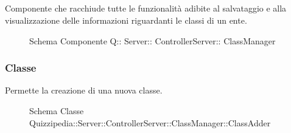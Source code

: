 \subsection{}
Componente che racchiude tutte le funzionalità adibite al salvataggio e alla visualizzazione delle informazioni riguardanti le classi di un ente.
\begin{figure}[H]
\centering
\noindent{}
\caption[Schema Componente Quizzipedia::Server::ControllerServer::ClassManager]{Schema Componente Q:: Server:: ControllerServer:: ClassManager}
\end{figure}
\subsubsection{Classe }
Permette la creazione di una nuova classe.
\begin{figure}[H]
\centering
\noindent{}
\caption[Schema Classe ClassAdder]{Schema Classe Quizzipedia::Server::ControllerServer::ClassManager::ClassAdder}
\end{figure}
